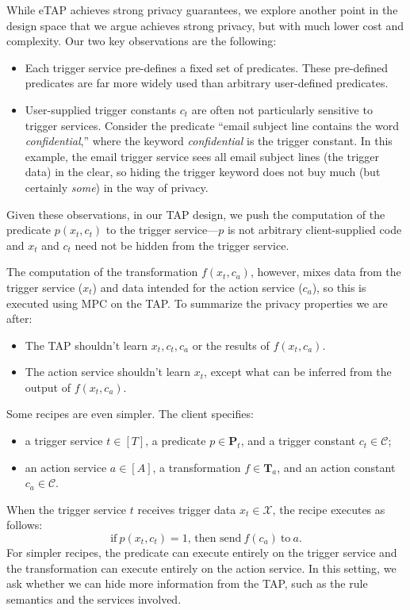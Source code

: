 While \textsf{eTAP} achieves strong privacy guarantees, we explore another point
in the design space that we argue achieves strong privacy, but with much lower
cost and complexity. Our two key observations are the following:
\begin{itemize}
  \item Each trigger service pre-defines a fixed set of predicates. These
    pre-defined predicates are far more widely used than arbitrary user-defined
    predicates.
  \item User-supplied trigger constants $c_t$ are often not particularly
    sensitive to trigger services. Consider the predicate ``email subject line
    contains the word \emph{confidential},'' where the keyword
    \emph{confidential} is the trigger constant. In this example, the email
    trigger service sees all email subject lines (the trigger data) in the
    clear, so hiding the trigger keyword does not buy much (but certainly
    \emph{some}) in the way of privacy.
\end{itemize}
Given these observations, in our TAP design, we push the computation of the
predicate $p(x_t, c_t)$ to the trigger service---$p$ is not arbitrary
client-supplied code and $x_t$ and $c_t$ need not be hidden from the trigger
service. 

The computation of the transformation $f(x_t, c_a)$, however, mixes data from
the trigger service ($x_t$) and data intended for the action service ($c_a$), so
this is executed using MPC on the TAP. To summarize the privacy properties we
are after:
\begin{itemize}
  \item The TAP shouldn't learn $x_t, c_t, c_a$ or the results of $f(x_t, c_a)$.
  \item The action service shouldn't learn $x_t$, except what can be inferred
    from the output of $f(x_t, c_a)$.
\end{itemize}

Some recipes are even simpler. The client specifies:
\begin{itemize}
  \item a trigger service $t \in [T]$, a predicate $p \in \mathbf{P}_t$, and a
    trigger constant $c_t \in \mathcal{C}$;
  \item an action service $a \in [A]$, a transformation $f \in \mathbf{T}_a$,
    and an action constant $c_a \in \mathcal{C}$.
\end{itemize}
When the trigger service $t$ receives trigger data $x_t \in \mathcal{X}$, the
recipe executes as follows:
\[
  \text{if}~p(x_t, c_t) = 1\text{, then send}~f(c_a)~\text{to}~a.
\]
For simpler recipes, the predicate can execute entirely on the trigger service
and the transformation can execute entirely on the action service. In this
setting, we ask whether we can hide more information from the TAP, such as the
rule semantics and the services involved. 
